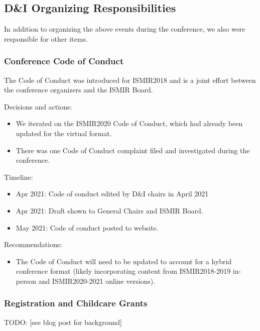 \documentclass[%
10pt,								%
]
{scrartcl}
\begin{document}
    \subsection{D\&I Organizing Responsibilities}
        In addition to organizing the above events during the conference, we also were responsible for other items.
        
        \subsubsection{Conference Code of Conduct}
            The Code of Conduct was introduced for ISMIR2018 and is a joint effort between the conference organizers and the ISMIR Board.
            
            Decisions and actions:
            \begin{itemize}
                \item   We iterated on the ISMIR2020 Code of Conduct, which had already been updated for the virtual format.
                \item   There was one Code of Conduct complaint filed and investigated during the conference.
            \end{itemize}

            Timeline:
            \begin{itemize}
                \item   Apr 2021: Code of conduct edited by D\&I chairs in April 2021
                \item   Apr 2021: Draft shown to General Chairs and ISMIR Board.
                \item   May 2021: Code of conduct posted to website.
            \end{itemize}

            Recommendations:
            \begin{itemize}
                \item   The Code of Conduct will need to be updated to account for a hybrid conference format (likely incorporating content from ISMIR2018-2019 in-person and ISMIR2020-2021 online versions).
            \end{itemize}

        \subsubsection{Registration and Childcare Grants}
            TODO: [see blog post for background]
            
\end{document}

